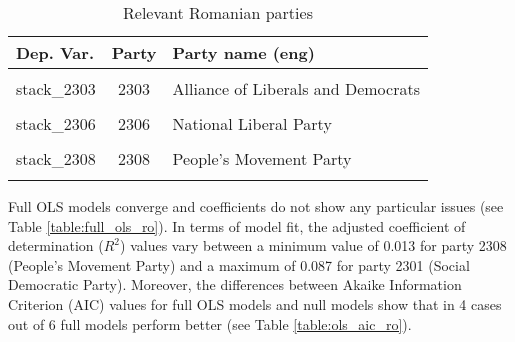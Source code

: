 \documentclass[
]{article}
\begin{document}
\begin{table}[!h]

\caption{\label{tab:unnamed-chunk-148}Relevant Romanian parties \label{table:relprty_tab_ro}}
\centering
\begin{tabular}[t]{lcl}
\toprule
Dep. Var. & Party & Party name (eng)\\
\midrule
\cellcolor{gray!6}{stack\_2301} & \cellcolor{gray!6}{2301} & \cellcolor{gray!6}{Social Democratic Party}\\
stack\_2303 & 2303 & Alliance of Liberals and Democrats\\
\cellcolor{gray!6}{stack\_2305} & \cellcolor{gray!6}{2305} & \cellcolor{gray!6}{PRO Romania}\\
stack\_2306 & 2306 & National Liberal Party\\
\cellcolor{gray!6}{stack\_2307} & \cellcolor{gray!6}{2307} & \cellcolor{gray!6}{Hungarian Democratic Alliance of Romania}\\
\addlinespace
stack\_2308 & 2308 & People's Movement Party\\
\cellcolor{gray!6}{stack\_2302} & \cellcolor{gray!6}{2302} & \cellcolor{gray!6}{2020 USR(1642421) -PLUS Alliance(1642422)}\\
\bottomrule
\end{tabular}
\end{table}

Full OLS models converge and coefficients do not show any particular issues (see Table
\ref{table:full_ols_ro}).
In terms of model fit, the adjusted coefficient of determination (\(R^2\)) values vary between
a minimum value of 0.013
for party 2308
(People's Movement Party)
and a maximum of 0.087
for party 2301
(Social Democratic Party).
Moreover, the differences between Akaike Information Criterion (AIC) values for full OLS models and null
models show that in 4 cases out of 6 full models perform better (see Table
\ref{table:ols_aic_ro}).
\end{document}
